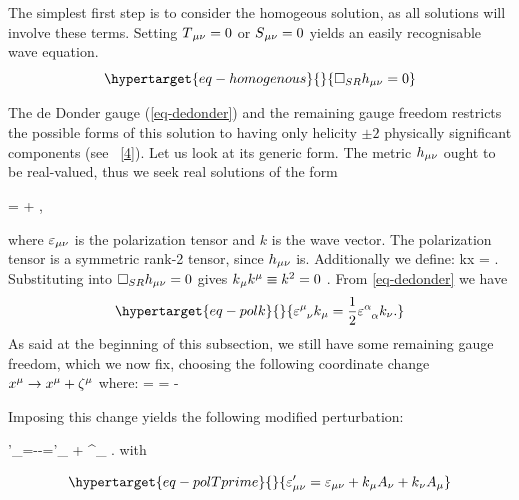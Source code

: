 \documentclass[
  10pt,
  a4paper,
  DIV=11,
  numbers=noendperiod,
  oneside]{scrreprt}
\let\[\relax \let\]\relax %
\DeclareRobustCommand{\[}{\begin{equation}}
\DeclareRobustCommand{\]}{\end{equation}}
\begin{document}
The simplest first step is to consider the homogeous solution, as all
solutions will involve these terms. Setting \(T{}_{\mu\nu}=0\) or \(S{}_{\mu\nu}=0\)
yields an easily recognisable wave equation.
\begin{equation}\protect\hypertarget{eq-homogenous}{}{
   \SRDA \weakmet = 0 
}\label{eq-homogenous}\end{equation}

The de Donder gauge (\ref{eq-dedonder}) and the remaining gauge
freedom restricts the
possible forms of this solution to having only helicity \(\pm2\)
physically significant components (see
~{[}\protect\hyperlink{ref-Weinberg:1972}{4}{]}). Let us look at its
generic form. The metric \(h{}_{\mu\nu}\) ought to be real-valued, thus we
seek real solutions of the form

\[
    \weakmet = \polco {} + \conjpolco {},
\]

where \(\varepsilon{}_{\mu\nu}\) is the polarization tensor and \(k\) is the wave
vector. The polarization tensor is a symmetric rank-2 tensor, since
\(h{}_{\mu\nu}\) is. Additionally we define: \[
    k\cdot x\equiv \mink {}  =  .
\] Substituting into \(\Box_{SR}h{}_{\mu\nu}=0\) gives
\(k{}_{\mu} k{}^{\mu} \equiv k^2=0\) . From \ref{eq-dedonder} we have
\begin{equation}\protect\hypertarget{eq-polk}{}{
    \polmix \co{k} = \frac{1}{2}\trpol k_\nu.
}\label{eq-polk}\end{equation} As said at the beginning of this
subsection, we still have some remaining gauge freedom, which we now
fix, choosing the following coordinate change
\(x{}^{\mu}\to x{}^{\mu}+\zeta{}^{\mu}\) where: \[
\ct{\zeta}=\im {}     =  - \im {} 
\]

Imposing this change yields the following modified perturbation:

\[
\weakTensor'_{\mu\nu}=\weakmet--=\polTensor'_{\mu\nu}  + \polTensor^{\prime\ast}{}_{\mu\nu} .
\] with

\begin{equation}\protect\hypertarget{eq-polTprime}{}{
\polTensor'_{\mu\nu} = \polco + \co{k}\co[\nu]{A} + \co[\nu]{k}\co{A}
}\label{eq-polTprime}\end{equation}
\end{document}

